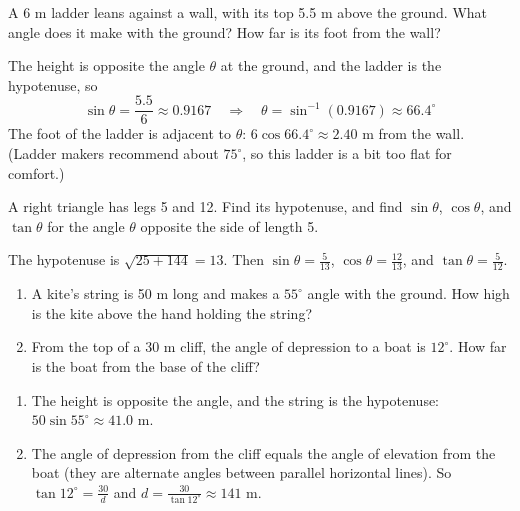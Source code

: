 \begin{Worked}
\begin{Problem}
A 6 m ladder leans against a wall, with its top 5.5 m above the
ground. What angle does it make with the ground? How far is its foot from the
wall?
\end{Problem}
\begin{Solution}
The height is opposite the angle $\theta$ at the ground, and the
ladder is the hypotenuse, so
$$\sin\theta = \frac{5.5}{6} \approx 0.9167 \quad\Longrightarrow\quad \theta = \sin^{-1}(0.9167) \approx 66.4^\circ$$
The foot of the ladder is adjacent to $\theta$:
$6\cos 66.4^\circ \approx 2.40$ m from the wall. (Ladder makers recommend about
$75^\circ$, so this ladder is a bit too flat for comfort.)
\end{Solution}
\end{Worked}

\begin{Exercise}[title={Ratios from Sides}, label=rt_ratios]
A right triangle has legs 5 and 12. Find its hypotenuse, and find
$\sin\theta$, $\cos\theta$, and $\tan\theta$ for the angle $\theta$ opposite the
side of length 5.
\end{Exercise}
\begin{Answer}[ref=rt_ratios]
The hypotenuse is $\sqrt{25 + 144} = 13$. Then $\sin\theta = \frac{5}{13}$,
$\cos\theta = \frac{12}{13}$, and $\tan\theta = \frac{5}{12}$.
\end{Answer}

\begin{Exercise}[title={Kite and Cliff}, label=rt_apps]
\begin{enumerate}
\item A kite's string is 50 m long and makes a $55^\circ$ angle with the ground.
How high is the kite above the hand holding the string?
\item From the top of a 30 m cliff, the angle of depression to a boat is
$12^\circ$. How far is the boat from the base of the cliff?
\end{enumerate}
\end{Exercise}
\begin{Answer}[ref=rt_apps]
\begin{enumerate}
\item The height is opposite the angle, and the string is the hypotenuse:
$50\sin 55^\circ \approx 41.0$ m.
\item The angle of depression from the cliff equals the angle of elevation from the
boat (they are alternate angles between parallel horizontal lines). So
$\tan 12^\circ = \frac{30}{d}$ and $d = \frac{30}{\tan 12^\circ} \approx 141$ m.
\end{enumerate}
\end{Answer}

